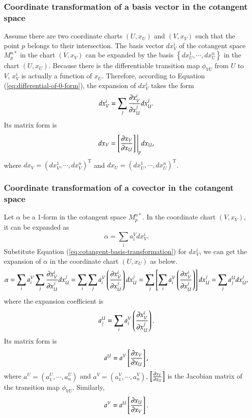 \documentclass[11pt, a4paper]{book}
\begin{document}
\subsubsection{Coordinate transformation of a basis vector in the cotangent space}

Assume there are two coordinate charts $(U,x_U)$ and $(V,x_V)$ such that the point $p$
belongs to their intersection. The basis vector $dx_V^{i}$ of the cotangent space
$M_p^{n*}$ in the chart $(V,x_V)$ can be expanded by the basis
$\left\{ dx_U^1,\cdots,dx_U^n \right\}$ in the chart $(U,x_U)$. Because there is the
differentiable transition map $\phi_{VU}$ from $U$ to $V$, $x_V^i$ is actually a function
of $x_U$. Therefore, according to Equation (\ref{eq:differential-of-0-form}), the
expansion of $dx_V^i$ takes the form
\begin{equation}
  \label{eq:cotangent-basis-transformation}
  dx_V^i=\sum_j \frac{\partial x_V^i}{\partial x_U^j} dx_U^j.
\end{equation}
Its matrix form is
\begin{equation}
  dx_V = \left[ \frac{\partial x_V}{\partial x_U} \right]\Bigg\vert_p dx_U,
\end{equation}
where $dx_V = (dx_V^1,\cdots,dx_V^n)^{\mathrm{T}}$ and $dx_U = (dx_U^1,\cdots,dx_U^n)^{\mathrm{T}}$.


\subsubsection{Coordinate transformation of a covector in the cotangent space}
\label{sec:covector-transformation}

Let $\alpha$ be a 1-form in the cotangent space $M_p^{n*}$. In the coordinate chart
$(V,x_V)$, it can be expanded as
\begin{equation*}
  \alpha = \sum_i a_i^V dx_V^i.
\end{equation*}
Substitute Equation (\ref{eq:cotangent-basis-transformation}) for $dx_V^i$, we can get the
expansion of $\alpha$ in the coordinate chart $(U,x_U)$ as below.
\begin{equation*}
  \alpha = \sum_i a_i^V \sum_j \frac{\partial x_V^i}{\partial x_U^j} dx_U^j = \sum_i\sum_j
  a_i^V \left( \frac{\partial x_V^i}{\partial x_U^j} \right) dx_U^j = \sum_j \left[ \sum_i
    a_i^V \left( \frac{\partial x_V^i}{\partial x_U^j} \right) \right] dx_U^j = \sum_j a_j^U dx_U^j,
\end{equation*}
where the expansion coefficient is
\begin{equation*}
  \label{eq:covector-transformation}
  a_j^U = \sum_i a_i^V \left( \frac{\partial x_V^i}{\partial x_U^j} \right).
\end{equation*}
Its matrix form is
\begin{equation}
  a^U = a^V \left[ \frac{\partial x_V}{\partial x_U} \right],
\end{equation}
where $a^U = (a_1^U,\cdots,a_n^U)$ and $a^V = (a_1^V,\cdots,a_n^V)$,
$\left[ \frac{\partial x_V}{\partial x_U} \right]$ is the Jacobian matrix of the transition map
$\phi_{VU}$. Similarly,
\begin{equation}
a^V = a^U \left[ \frac{\partial x_U}{\partial x_V} \right].
\end{equation}
\end{document}
